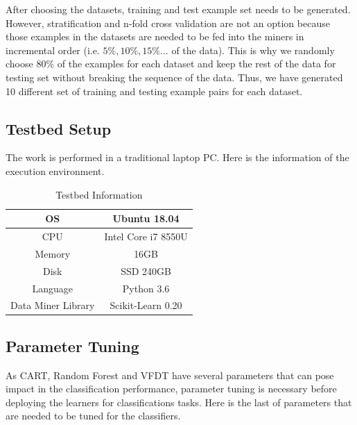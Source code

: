 \documentclass[sigplan]{acmart}\settopmatter{printfolios=true,printccs=false,printacmref=false}
\begin{document}
After choosing the datasets, training and test example set needs to be generated. However, stratification and n-fold cross validation are not an option because those examples in the datasets are needed to be fed into the miners in incremental order (i.e. $5\%, 10\%, 15\%... $ of the data). This is why we randomly choose $80\%$ of the examples for each dataset and keep the rest of the data for testing set without breaking the sequence of the data. Thus, we have generated 10 different set of training and testing example pairs for each dataset. 

\subsection{Testbed Setup}
The work is performed in a traditional laptop PC. Here is the information of the execution environment.

\begin{center}
	\begin{table}[h]
		\begin{tabular}{|c|c|}
			\hline 
			OS & Ubuntu 18.04 \\ 
			\hline 
			CPU & Intel Core i7 8550U \\ 
			\hline 
			Memory & 16GB \\ 
			\hline 
			Disk & SSD 240GB \\ 
			\hline 
			Language & Python 3.6 \\ 
			\hline 
			Data Miner Library & Scikit-Learn 0.20 \\ 
			\hline  
		\end{tabular} 
	\caption{Testbed Information}
	\label{tab:testbed}
	\end{table}
\end{center}

\subsection{Parameter Tuning}
As CART, Random Forest and VFDT have several parameters that can pose impact in the classification performance, parameter tuning is necessary before deploying the learners for classifications tasks. Here is the last of parameters that are needed to be tuned for the classifiers.
\end{document}
